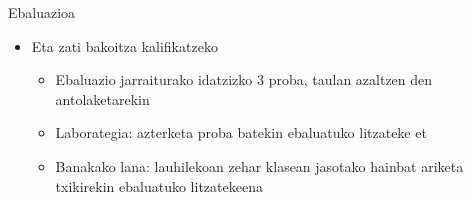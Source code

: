 \documentclass[
 10pt,%
 compress,%
 t,       %
 xcolor=svgnames
]{beamer}
\theoremstyle{definition} \newtheorem{definicion}{Definicion}[section]
\theoremstyle{propiedades} \newtheorem{propiedades}{Propiedades}[section]
\begin{document}
\begin{frame}{Ebaluazioa}
{\begin{itemize}
\begin{itemize}
		\item Laborategiak: a $\%25$ pisua
		\item Banakako lana: 
		
	\end{itemize}

       \item Eta zati bakoitza kalifikatzeko
       
    \begin{itemize}
   
	
	\item Ebaluazio jarraiturako
				idatzizko 3 proba, taulan azaltzen den antolaketarekin


    \item Laborategia: azterketa proba batekin ebaluatuko litzateke et
    
    \item Banakako lana: lauhilekoan zehar klasean jasotako hainbat ariketa txikirekin ebaluatuko litzatekeena
    

    \end{itemize}
	
	\end{itemize}
	
	
}





\end{frame}
	
	
\end{document}
